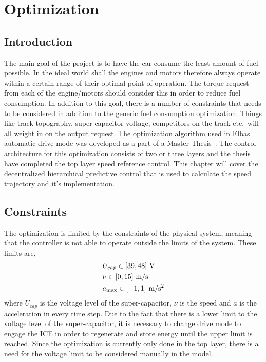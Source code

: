 \chapter{Optimization}
\section{Introduction}
The main goal of the project is to have the car consume the least amount of fuel
possible.  In the ideal world shall the engines and motors therefore always
operate within a certain range of their optimal point of operation. The torque
request from each of the engine/motors should consider this in order to reduce
fuel consumption. In addition to this goal, there is a number of constraints
that needs to be considered in addition to the generic fuel consumption
optimization.  Things like track topography, super-capacitor voltage,
competitors on the track etc.\ will all weight in on the output request. The
optimization algorithm used in Elbas automatic drive mode was developed as a
part of a Master Thesis~\cite{liu2016}. The control architecture for this
optimization consists of two or three layers and the thesis have completed the
top layer speed reference control. This chapter will cover the decentralized
hierarchical predictive control that is used to calculate the speed trajectory
and it's implementation.

\section{Constraints}
The optimization is limited by the constraints of the physical system, meaning that
the controller is not able to operate outside the limits of the system. These limits
are,
\begin{align}
    &U_{cap} \in [39,48]~\textup{V} \\
    &\nu \in [0,15]~\textup{m/s}\\
    &a_{\max} \in [-1,1]~\textup{m/s$^2$}
\end{align}
where $U_{cap}$ is the voltage level of the super-capacitor, $\nu$ is the speed
and $a$ is the acceleration in every time step. Due to the fact that there is a
lower limit to the voltage level of the super-capacitor, it is necessary to
change drive mode to engage the ICE in order to regenerate and store energy
until the upper limit is reached. Since the optimization is currently only done
in the top layer, there is a need for the voltage limit to be considered
manually in the model.

